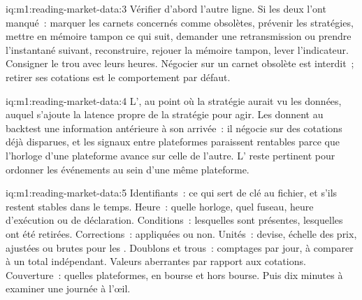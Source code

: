 \begin{solution}{iq:m1:reading-market-data:3}
Vérifier d'abord l'autre ligne. Si les deux l'ont manqué~: marquer les carnets concernés
comme obsolètes, prévenir les stratégies, mettre en mémoire tampon ce qui suit, demander une retransmission ou
prendre l'instantané suivant, reconstruire, rejouer la mémoire tampon, lever l'indicateur. Consigner le
trou avec leurs heures. Négocier sur un carnet obsolète est interdit~; retirer ses cotations est
le comportement par défaut.
\end{solution}

\begin{solution}{iq:m1:reading-market-data:4}
L', au point où la stratégie aurait vu les
données, auquel s'ajoute la latence propre de la stratégie pour agir. Les  donnent
au backtest une information antérieure à son arrivée~: il négocie sur des cotations déjà disparues, et les
signaux entre plateformes paraissent rentables parce que l'horloge d'une
plateforme avance sur celle de l'autre. L' reste pertinent pour
ordonner les événements au sein d'une même plateforme.
\end{solution}

\begin{solution}{iq:m1:reading-market-data:5}
Identifiants~: ce qui sert de clé au fichier, et s'ils restent stables dans le temps. Heure~:
quelle horloge, quel fuseau, heure d'exécution ou de déclaration. Conditions~: lesquelles sont
présentes, lesquelles ont été retirées. Corrections~: appliquées ou non. Unités~: devise, échelle des
prix, ajustées ou brutes pour les . Doublons et trous~: comptages par jour, à comparer à
un total indépendant. Valeurs aberrantes par rapport aux cotations. Couverture~: quelles
plateformes, en bourse et hors bourse. Puis dix minutes à examiner une journée à l'œil.
\end{solution}


